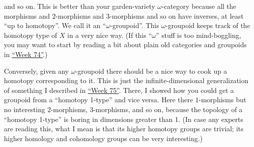 \documentclass{article}
\begin{document}
\begin{itemize}
  and so on. This is better than your garden-variety \(\omega\)-category
  because all the morphisms and \(2\)-morphisms and \(3\)-morphisms and
  so on have inverses, at least ``up to homotopy''. We call it an
  ``\(\omega\)-groupoid''. This \(\omega\)-groupoid keeps track of the
  homotopy type of \(X\) in a very nice way. (If this ``\(\omega\)''
  stuff is too mind-boggling, you may want to start by reading a bit
  about plain old categories and groupoids in
  \protect\hyperlink{week74}{``Week 74''}.)

  Conversely, given any \(\omega\)-groupoid there should be a nice way
  to cook up a homotopy corresponding to it. This is just the
  infinite-dimensional generalization of something I described in
  \protect\hyperlink{week75}{``Week 75''}. There, I showed how you could
  get a groupoid from a ``homotopy 1-type'' and vice versa. Here there
  \(1\)-morphisms but no interesting \(2\)-morphisms, \(3\)-morphisms,
  and so on, because the topology of a ``homotopy 1-type'' is boring in
  dimensions greater than 1. (In case any experts are reading this, what
  I mean is that its higher homotopy groups are trivial; its higher
  homology and cohomology groups can be very interesting.)


\end{itemize}
\end{document}
